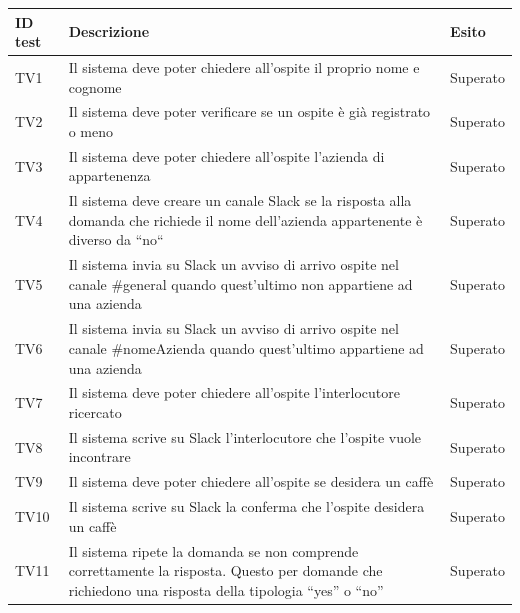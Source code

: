 \documentclass[../PianoDiQualifica_v4.0.0.tex]{subfiles}
\begin{document}
	\begin{longtable}[c] { >{\centering\arraybackslash}p{4cm} p{7cm} >{\centering\arraybackslash}p{4cm}}
		\toprule
		\centerline{\textbf{ID test}} & \centerline{\textbf{Descrizione}} & \centerline{\textbf{Esito}} \\
			\midrule
			TV1 & Il sistema deve poter chiedere all'ospite il proprio nome e cognome & Superato \\
			\addlinespace[0.3em]
			\midrule
			\addlinespace[0.3em]
			TV2 & Il sistema deve poter verificare se un ospite è già registrato o meno & Superato \\
			\addlinespace[0.3em]
			\midrule
			\addlinespace[0.3em]
			TV3 & Il sistema deve poter chiedere all'ospite l'azienda di appartenenza & Superato \\
			\addlinespace[0.3em]
			\midrule
			\addlinespace[0.3em]
			TV4 & Il sistema deve creare un canale Slack se la risposta alla domanda che richiede il nome dell'azienda appartenente è diverso da ``no`` & Superato \\
			\addlinespace[0.3em]
			\midrule
			\addlinespace[0.3em]
			TV5 &  Il sistema invia su Slack un avviso di arrivo ospite nel canale \#general quando quest'ultimo non appartiene ad una azienda & Superato \\
			\addlinespace[0.3em]
			\midrule
			\addlinespace[0.3em]
			TV6 &  Il sistema invia su Slack un avviso di arrivo ospite nel canale \#nomeAzienda quando quest'ultimo appartiene ad una azienda & Superato \\
			\addlinespace[0.3em]
			\midrule
			\addlinespace[0.3em]
			TV7 &  Il sistema deve poter chiedere all'ospite l'interlocutore ricercato & Superato \\
			\addlinespace[0.3em]
			\midrule
			\addlinespace[0.3em]
			TV8 &  Il sistema scrive su Slack l’interlocutore che l’ospite vuole incontrare & Superato \\
			\addlinespace[0.3em]
			\midrule
			\addlinespace[0.3em]
			TV9 &  Il sistema deve poter chiedere all'ospite se desidera un caffè & Superato \\
			\addlinespace[0.3em]
			\midrule
			\addlinespace[0.3em]
			TV10 & Il sistema scrive su Slack la conferma che l'ospite desidera un caffè & Superato \\
			\addlinespace[0.3em]
			\midrule
			\addlinespace[0.3em]
			TV11 & Il sistema ripete la domanda se non comprende correttamente la risposta.
			Questo per domande che richiedono una risposta della tipologia “yes” o “no” & Superato \\

\end{longtable}
\end{document}
